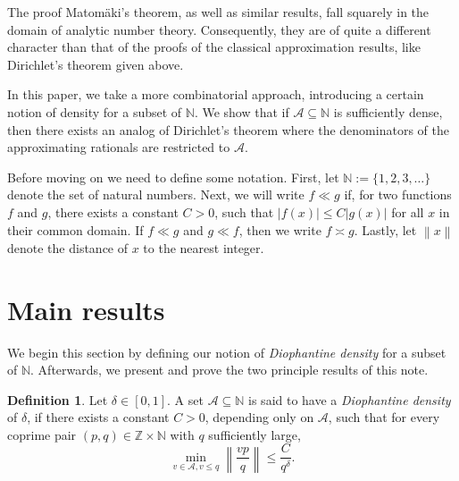 \documentclass[reqno]{amsart}
\theoremstyle{definition}
\newtheorem{definition}{Definition}
\newcommand{\dnint}[1]{\left\|{#1}\right\|}
\begin{document}
The proof Matom{\"a}ki's theorem, as well as similar results, fall squarely in the domain of analytic number theory.  Consequently, they are of quite a different character than that of the proofs of the classical approximation results, like Dirichlet's theorem given above.

In this paper, we take a more combinatorial approach, introducing a certain notion of density for a subset of $\mathbb{N}$. We show that if $\mathcal{A} \subseteq \mathbb{N}$ is sufficiently dense, then there exists an analog of Dirichlet's theorem where the denominators of the approximating rationals are restricted to $\mathcal{A}$.

Before moving on we need to define some notation.  First, let $\mathbb{N} := \{1,2,3,\dots\}$ denote the set of natural numbers.  Next, we will write $f \ll g$ if, for two functions $f$ and $g$, there exists a constant $C > 0$, such that $\vert{f(x)}\vert \leq C \vert{g(x)}\vert$ for all $x$ in their common domain.  If $f \ll g$ and $g \ll f$, then we write $f \asymp g$.  Lastly, let $\dnint{x}$ denote the distance of $x$ to the nearest integer.

\section{Main results}
We begin this section by defining our notion of \textit{Diophantine density} for a subset of $\mathbb{N}$.  Afterwards, we present and prove the two principle results of this note.
\begin{definition}
    Let $\delta \in [0,1]$. A set $\mathcal{A} \subseteq \mathbb{N}$ is said to have a \textit{Diophantine density} of $\delta$, if there exists a constant $C > 0$, depending only on $\mathcal{A}$, such that for every coprime pair $(p,q) \in \mathbb{Z} \times \mathbb{N}$ with $q$ sufficiently large,
    \begin{equation*}
    \min_{v\in\mathcal{A},v\leq q}\dnint{\frac{v p}{q}} \leq \frac{C}{q^{\delta}}.
\end{equation*}
\end{definition}
\end{document}
